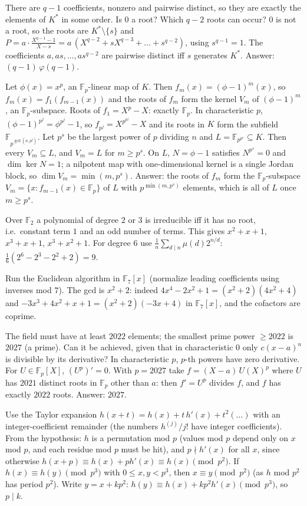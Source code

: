 \documentclass[11pt,a4paper]{article}
\begin{document}
 There are $q-1$ coefficients, nonzero and pairwise distinct, so they are exactly the elements of $K^*$ in some order. Is $0$ a root? Which $q-2$ roots can occur?
 $0$ is not a root, so the roots are $K^*\setminus\{s\}$ and $P=a\cdot\frac{X^{q-1}-1}{X-s}=a\,(X^{q-2}+sX^{q-3}+\dots+s^{q-2})$, using $s^{q-1}=1$.
 The coefficients $a,as,\dots,as^{q-2}$ are pairwise distinct iff $s$ generates $K^*$. Answer: $(q-1)\,\varphi(q-1)$.

 Let $\phi(x)=x^p$, an $\mathbb{F}_p$-linear map of $K$. Then $f_m(x)=(\phi-1)^m(x)$, so $f_m(x)=f_1(f_{m-1}(x))$ and the roots of $f_m$ form the kernel $V_m$ of $(\phi-1)^m$, an $\mathbb{F}_p$-subspace. Roots of $f_1=X^p-X$: exactly $\mathbb{F}_p$.
 In characteristic $p$, $(\phi-1)^{p^j}=\phi^{p^j}-1$, so $f_{p^j}=X^{p^{p^j}}-X$ and its roots in $K$ form the subfield $\mathbb{F}_{p^{\gcd(n,p^j)}}$. Let $p^s$ be the largest power of $p$ dividing $n$ and $L=\mathbb{F}_{p^{p^s}}\subseteq K$. Then every $V_m\subseteq L$, and $V_m=L$ for $m\ge p^s$.
 On $L$, $N=\phi-1$ satisfies $N^{p^s}=0$ and $\dim\ker N=1$; a nilpotent map with one-dimensional kernel is a single Jordan block, so $\dim V_m=\min(m,p^s)$. Answer: the roots of $f_m$ form the $\mathbb{F}_p$-subspace $V_m=\{x: f_{m-1}(x)\in\mathbb{F}_p\}$ of $L$ with $p^{\min(m,p^s)}$ elements, which is all of $L$ once $m\ge p^s$.

 Over $\mathbb{F}_2$ a polynomial of degree $2$ or $3$ is irreducible iff it has no root, i.e.\ constant term $1$ and an odd number of terms. This gives $x^2+x+1$, $x^3+x+1$, $x^3+x^2+1$.
 For degree $6$ use $\frac1n\sum_{d\mid n}\mu(d)2^{n/d}$: $\frac16(2^6-2^3-2^2+2)=9$.

 Run the Euclidean algorithm in $\mathbb{F}_7[x]$ (normalize leading coefficients using inverses mod $7$).
 The gcd is $x^2+2$: indeed $4x^4-2x^2+1=(x^2+2)(4x^2+4)$ and $-3x^3+4x^2+x+1=(x^2+2)(-3x+4)$ in $\mathbb{F}_7[x]$, and the cofactors are coprime.

 The field must have at least $2022$ elements; the smallest prime power $\ge2022$ is $2027$ (a prime). Can it be achieved, given that in characteristic $0$ only $c(x-a)^n$ is divisible by its derivative?
 In characteristic $p$, $p$-th powers have zero derivative. For $U\in\mathbb{F}_p[X]$, $(U^p)'=0$.
 With $p=2027$ take $f=(X-a)\,U(X)^p$ where $U$ has $2021$ distinct roots in $\mathbb{F}_p$ other than $a$: then $f'=U^p$ divides $f$, and $f$ has exactly $2022$ roots. Answer: $2027$.

 Use the Taylor expansion $h(x+t)=h(x)+t\,h'(x)+t^2(\dots)$ with an integer-coefficient remainder (the numbers $h^{(j)}/j!$ have integer coefficients).
 From the hypothesis: $h$ is a permutation mod $p$ (values mod $p$ depend only on $x$ mod $p$, and each residue mod $p$ must be hit), and $p\nmid h'(x)$ for all $x$, since otherwise $h(x+p)\equiv h(x)+ph'(x)\equiv h(x)\pmod{p^2}$.
 If $h(x)\equiv h(y)\pmod{p^3}$ with $0\le x,y<p^3$, then $x\equiv y\pmod{p^2}$ (as $h$ mod $p^2$ has period $p^2$). Write $y=x+kp^2$: $h(y)\equiv h(x)+kp^2h'(x)\pmod{p^3}$, so $p\mid k$.
\end{document}

